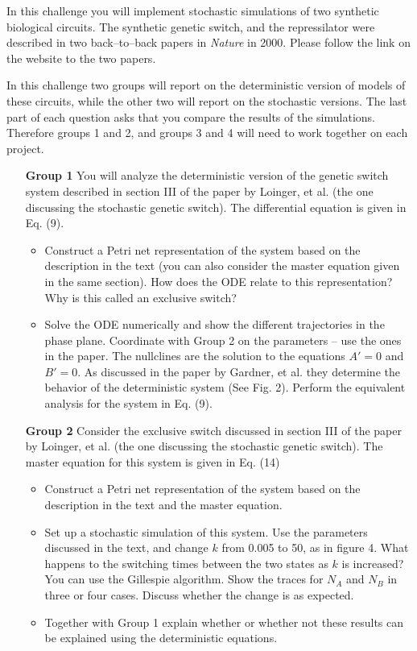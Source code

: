 \documentclass[12pt]{article}
\begin{document}
In this challenge you will implement stochastic simulations of two synthetic biological circuits.
The synthetic genetic switch, and the repressilator were described in two back--to--back papers
in \emph{Nature} in 2000.  Please follow the link on the website to the two papers. 

In this challenge two groups will report on the deterministic version of models of these circuits, while the other two
will report on the stochastic versions. The last part of each question asks that you 
compare the results of the simulations. Therefore groups 1 and 2, and groups 3 and 4 will
need to work together on each project.


%
\begin{enumerate}
\item[\bf Group 1] You will analyze the deterministic version of the genetic switch system described in section III of the paper by Loinger, et al. 
(the one discussing the stochastic genetic switch).  The differential equation is given in Eq. (9). 
\begin{itemize}
\item Construct a Petri net representation of the system based on the description in the text  (you can
also consider the master equation given in the same section).   
How does the ODE relate to this representation? Why is this called an exclusive switch?
\item Solve the ODE numerically and show the different trajectories in the phase plane.
Coordinate with Group 2 on the parameters -- use the ones in the paper.  
The nullclines are the solution to the equations $A' = 0$ and $B' = 0$.  As discussed in the paper
by Gardner, et al. they determine the behavior of the deterministic system (See Fig. 2). Perform the equivalent
analysis for the system in Eq. (9).
\end{itemize}



\item[\bf Group 2] Consider the exclusive switch discussed in section III of the paper by Loinger, et al. 
(the one discussing the stochastic genetic switch). The master equation for this system is given in Eq. (14) 
\begin{itemize}
\item Construct a Petri net representation of the system based on the description in the text 
and the master equation. 
\item  Set up a stochastic simulation of this system. Use the parameters discussed in the text, 
and change $k$ from 0.005 to 50, as in figure 4. What happens to the switching times 
between the two states as $k$ is increased? You can use the Gillespie algorithm. 
Show the traces for $N_{A}$ and $N_{B}$ in three or four cases.   Discuss whether the
change is as expected.
\item Together with Group 1 explain whether or whether not these results can be explained 
using the deterministic equations.
\end{itemize}


\end{enumerate}
\end{document}
